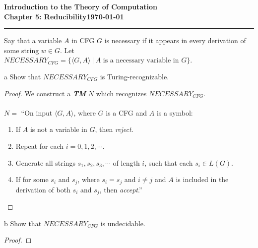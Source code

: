 \documentclass[11pt]{article}
\newcommand{\dated}{\today}
\begin{document}
\textbf{Introduction to the Theory of
Computation}\hfill\textbf{\myname}\\[0.01in]
\textbf{Chapter 5: Reducibility}\hfill\textbf{\dated}\\
\smallskip\hrule\bigskip

\begin{problem}{5.35}
Say that a variable $A$ in CFG $G$ is necessary if it appears in every derivation of some string $w \in G$. Let $NECESSARY_{CFG} = \{\langle G, A \rangle \ | \ A \text{ is a necessary variable in } G\}$.
\end{problem}

\begin{problem}[Part]{a}
Show that $NECESSARY_{CFG}$ is Turing-recognizable.
\end{problem}

\begin{proof}
We construct a \textbf{\textit{TM}} $N$ which recognizes $NECESSARY_{CFG}$. \\
\\
$N =$ \textquotedblleft On input $\langle G, A \rangle$, where $G$ is a CFG and $A$ is a symbol:
\begin{enumerate}
\item If $A$ is not a variable in $G$, then \textit{reject}.
\item Repeat for each $i = 0, 1, 2, \cdots$.
\item \hspace*{0.5cm} Generate all strings $s_1, s_2, s_3, \cdots$ of length $i$, such that each $s_i \in L(G)$.
\item \hspace*{0.5cm} If for some $s_i$ and $s_j$, where $s_i = s_j$ and $i \neq j$ and $A$ is included in the \\
\hspace*{0.5cm} derivation of both $s_i$ and $s_j$, then \textit{accept}.\textquotedblright
\end{enumerate}
\end{proof}

\begin{problem}[Part]{b}
Show that $NECESSARY_{CFG}$ is undecidable.
\end{problem}

\begin{proof}
\end{proof}
\end{document}
